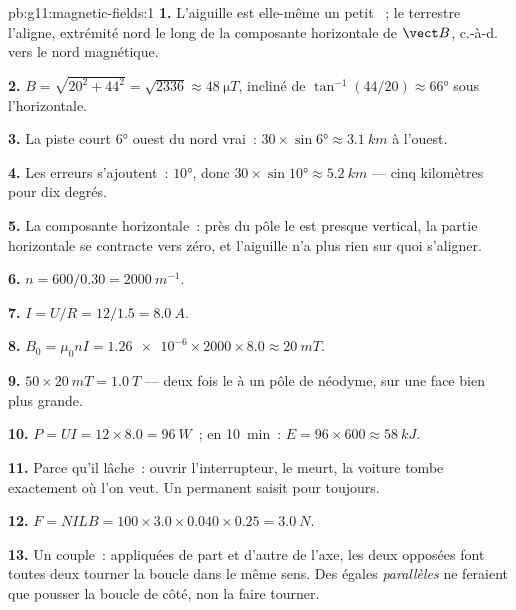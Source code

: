 \begin{solution}{pb:g11:magnetic-fields:1}
\textbf{1.} L'aiguille est elle-même un petit
~; le
 terrestre l'aligne, extrémité
nord le long de la composante horizontale de $\vect B$, c.-à-d. vers le
nord magnétique.

\textbf{2.} $B = \sqrt{20^2 + 44^2} = \sqrt{2336} \approx
\qty{48}{\micro T}$, incliné de $\tan^{-1}(44/20) \approx \ang{66}$ sous
l'horizontale.

\textbf{3.} La piste court $\ang{6}$ ouest du nord vrai~:
$30 \times \sin\ang{6} \approx \qty{3.1}{km}$ à l'ouest.

\textbf{4.} Les erreurs s'ajoutent~: $\ang{10}$, donc
$30 \times \sin\ang{10} \approx \qty{5.2}{km}$ --- cinq kilomètres pour
dix degrés.

\textbf{5.} La composante horizontale~: près du pôle le
 est presque vertical, la
partie horizontale se contracte vers zéro, et l'aiguille n'a plus rien
sur quoi s'aligner.

\textbf{6.} $n = 600/0.30 = \qty{2000}{m^{-1}}$.

\textbf{7.} $I = U/R = 12/1.5 = \qty{8.0}{A}$.

\textbf{8.} $B_0 = \mu_0 n I = \num{1.26e-6} \times 2000 \times 8.0
\approx \qty{20}{mT}$.

\textbf{9.} $50 \times \qty{20}{mT} = \qty{1.0}{T}$ --- deux fois le
 à un pôle de néodyme, sur une
face bien plus grande.

\textbf{10.} $P = UI = 12 \times 8.0 = \qty{96}{W}$~; en
\qty{10}{\minute}~: $E = 96 \times 600 \approx \qty{58}{kJ}$.

\textbf{11.} Parce qu'il lâche~: ouvrir l'interrupteur, le
 meurt, la voiture tombe
exactement où l'on veut. Un
 permanent saisit pour toujours.

\textbf{12.} $F = NILB = 100 \times 3.0 \times 0.040 \times 0.25 =
\qty{3.0}{N}$.

\textbf{13.} Un couple~: appliquées de part et d'autre de l'axe, les
deux  opposées font toutes deux
tourner la boucle dans le même sens. Des
 égales \emph{parallèles} ne feraient
que pousser la boucle de côté, non la faire tourner.


\end{solution}
